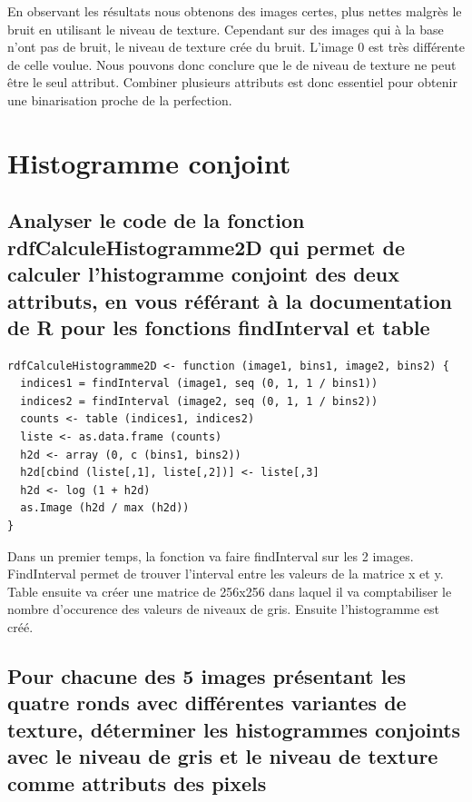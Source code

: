 \documentclass[a4paper,12pt]{report}
\begin{document}
En observant les résultats nous obtenons des images certes, plus nettes malgrès le bruit en utilisant le niveau de  texture. Cependant sur des images qui à la base n'ont pas de bruit, le niveau de texture crée du bruit. L'image 0 est très différente de celle voulue. Nous pouvons donc conclure que le de niveau de texture ne peut être le seul attribut. Combiner plusieurs attributs est donc essentiel pour obtenir une binarisation proche de la perfection.

\newpage


\section*{Histogramme conjoint}

\subsection*{Analyser le code de la fonction rdfCalculeHistogramme2D qui permet de calculer l'histogramme conjoint des deux attributs, en vous référant à la documentation de R pour les fonctions findInterval et table}

\begin{lstlisting}
rdfCalculeHistogramme2D <- function (image1, bins1, image2, bins2) {
  indices1 = findInterval (image1, seq (0, 1, 1 / bins1))
  indices2 = findInterval (image2, seq (0, 1, 1 / bins2))
  counts <- table (indices1, indices2)
  liste <- as.data.frame (counts)
  h2d <- array (0, c (bins1, bins2))
  h2d[cbind (liste[,1], liste[,2])] <- liste[,3]
  h2d <- log (1 + h2d)
  as.Image (h2d / max (h2d))
}
\end{lstlisting}

Dans un premier temps, la fonction va faire findInterval sur les 2 images. FindInterval permet de trouver l'interval entre les valeurs de la matrice x et y. Table ensuite va créer une matrice de 256x256 dans laquel il va comptabiliser le nombre d'occurence des valeurs de niveaux de gris.
Ensuite l'histogramme est créé.

\subsection*{Pour chacune des 5 images présentant les quatre ronds avec différentes variantes de texture, déterminer les histogrammes conjoints avec le niveau de gris et le niveau de texture comme attributs des pixels}
\end{document}
